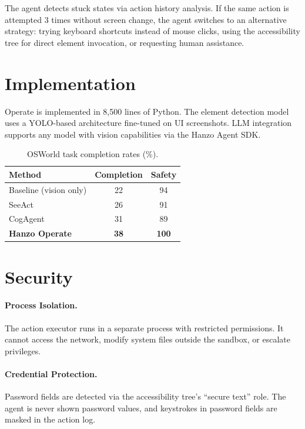 \documentclass[11pt,twocolumn]{article}
\begin{document}
The agent detects stuck states via action history analysis. If the same action is attempted 3 times without screen change, the agent switches to an alternative strategy: trying keyboard shortcuts instead of mouse clicks, using the accessibility tree for direct element invocation, or requesting human assistance.

\section{Implementation}

Operate is implemented in 8,500 lines of Python. The element detection model uses a YOLO-based architecture fine-tuned on UI screenshots. LLM integration supports any model with vision capabilities via the Hanzo Agent SDK.

\begin{table}[h]
\centering
\caption{OSWorld task completion rates (\%).}
\label{tab:osworld}
\begin{tabular}{lcc}
\toprule
\textbf{Method} & \textbf{Completion} & \textbf{Safety} \\
\midrule
Baseline (vision only) & 22 & 94 \\
SeeAct~\cite{zheng2024} & 26 & 91 \\
CogAgent & 31 & 89 \\
\midrule
\textbf{Hanzo Operate} & \textbf{38} & \textbf{100} \\
\bottomrule
\end{tabular}
\end{table}

\section{Security}

\paragraph{Process Isolation.} The action executor runs in a separate process with restricted permissions. It cannot access the network, modify system files outside the sandbox, or escalate privileges.

\paragraph{Credential Protection.} Password fields are detected via the accessibility tree's ``secure text'' role. The agent is never shown password values, and keystrokes in password fields are masked in the action log.
\end{document}
